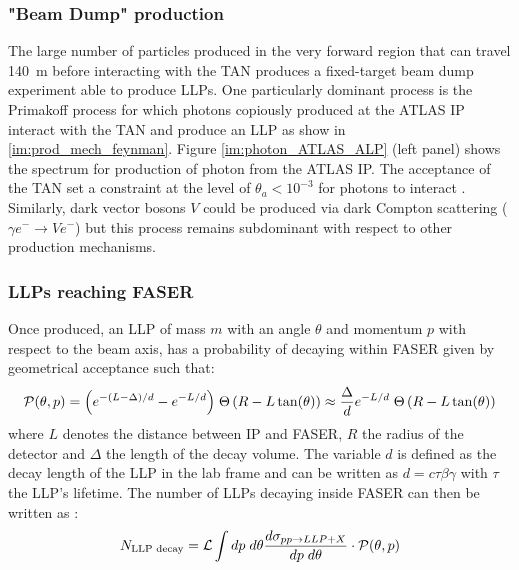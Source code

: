 		\subsubsection{"Beam Dump" production}
		
		The large number of particles produced in the very forward region that can travel \SI{140}{\meter} before interacting with the TAN produces a fixed-target beam dump experiment able to produce LLPs. One particularly dominant process is the Primakoff process for which photons copiously produced at the ATLAS IP interact with the TAN and produce an LLP as show in \ref{im:prod_mech_feynman}. Figure \ref{im:photon_ATLAS_ALP} (left panel) shows the spectrum for production of photon from the ATLAS IP. The acceptance of the TAN set a constraint at the level of $\theta_a < 10^{-3}$ for photons to interact \cite{Primakoff_process}. Similarly, dark vector bosons $V$ could be produced via dark Compton scattering ($ \gamma e^- \rightarrow V e^-$) but this process remains subdominant with respect to other production mechanisms. 
	
		
		\subsubsection{LLPs reaching FASER}
		Once produced, an LLP of mass $m$  with an angle $\theta$ and momentum $p$ with respect to the beam axis, has a probability of decaying within FASER given by geometrical acceptance such that: 
		\begin{equation}
			\mathcal{P}(\theta, p) = {\left( e^{-(L-\Delta)/d} - e^{-L/d}\right)} \hspace{1mm} \Theta \left(R-L\tan(\theta)\right) \approx \frac{\Delta}{d}e^{-L/d} \hspace{1mm} \Theta \left(R-L\tan(\theta)\right)
		\end{equation}
		where $L$ denotes the distance between IP and FASER, $R$ the radius of the detector and $\Delta$ the length of the decay volume. The variable $d$ is defined as the decay length of the LLP in the lab frame and can be written as $d = c \tau \beta \gamma$ with $\tau$ the LLP's lifetime. The number of LLPs decaying inside FASER can then be written as \cite{FASER_LLP}: 
		\begin{equation}
			N_{\text{LLP decay}} = \mathcal{L} \int dp \hspace{1mm} d\theta \frac{d\sigma_{pp \rightarrow LLP + X}}{dp \hspace{1mm} d\theta} \cdot \mathcal{P}(\theta, p)
		\end{equation}
		
